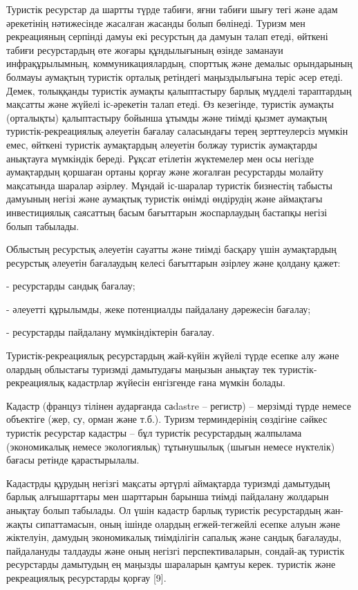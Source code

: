 \begin{multicols}{2}
Туристік ресурстар да шартты түрде табиғи, яғни табиғи шығу тегі және
адам әрекетінің нәтижесінде жасалған жасанды болып бөлінеді. Туризм мен
рекреацияның серпінді дамуы екі ресурстың да дамуын талап етеді, өйткені
табиғи ресурстардың өте жоғары құндылығының өзінде заманауи
инфрақұрылымның, коммуникациялардың, спорттық және демалыс орындарының
болмауы аумақтың туристік орталық ретіндегі маңыздылығына теріс әсер
етеді. Демек, толыққанды туристік аумақты қалыптастыру барлық мүдделі
тараптардың мақсатты және жүйелі іс-әрекетін талап етеді. Өз кезегінде,
туристік аумақты (орталықты) қалыптастыру бойынша ұтымды және тиімді
қызмет аумақтың туристік-рекреациялық әлеуетін бағалау саласындағы терең
зерттеулерсіз мүмкін емес, өйткені туристік аумақтардың әлеуетін болжау
туристік аумақтарды анықтауға мүмкіндік береді. Рұқсат етілетін
жүктемелер мен осы негізде аумақтардың қоршаған ортаны қорғау және
жоғалған ресурстарды молайту мақсатында шаралар әзірлеу. Мұндай
іс-шаралар туристік бизнестің табысты дамуының негізі және аумақтық
туристік өнімді өндірудің және аймақтағы инвестициялық саясаттың басым
бағыттарын жоспарлаудың бастапқы негізі болып табылады.

Облыстың ресурстық әлеуетін сауатты және тиімді басқару үшін аумақтардың
ресурстық әлеуетін бағалаудың келесі бағыттарын әзірлеу және қолдану
қажет:

- ресурстарды сандық бағалау;

- әлеуетті құрылымды, жеке потенциалды пайдалану дәрежесін бағалау;

- ресурстарды пайдалану мүмкіндіктерін бағалау.

Туристік-рекреациялық ресурстардың жай-күйін жүйелі түрде есепке алу
және олардың облыстағы туризмді дамытудағы маңызын анықтау тек
туристік-рекреациялық кадастрлар жүйесін енгізгенде ғана мүмкін болады.

Кадастр (француз тілінен аударғанда саdastre -- регистр) -- мерзімді
түрде немесе объектіге (жер, су, орман және т.б.). Туризм терминдерінің
сөздігіне сәйкес туристік ресурстар кадастры -- бұл туристік
ресурстардың жалпылама (экономикалық немесе экологиялық) тұтынушылық
(шығын немесе нүктелік) бағасы ретінде қарастырылалы.

Кадастрды құрудың негізгі мақсаты әртүрлі аймақтарда туризмді дамытудың
барлық алғышарттары мен шарттарын барынша тиімді пайдалану жолдарын
анықтау болып табылады. Ол үшін кадастр барлық туристік ресурстардың
жан-жақты сипаттамасын, оның ішінде олардың егжей-тегжейлі есепке алуын
және жіктелуін, дамудың экономикалық тиімділігін сапалық және сандық
бағалауды, пайдалануды талдауды және оның негізгі перспективаларын,
сондай-ақ туристік ресурстарды дамытудың ең маңызды шараларын қамтуы
керек. туристік және рекреациялық ресурстарды қорғау {[}9{]}.


\end{multicols}
